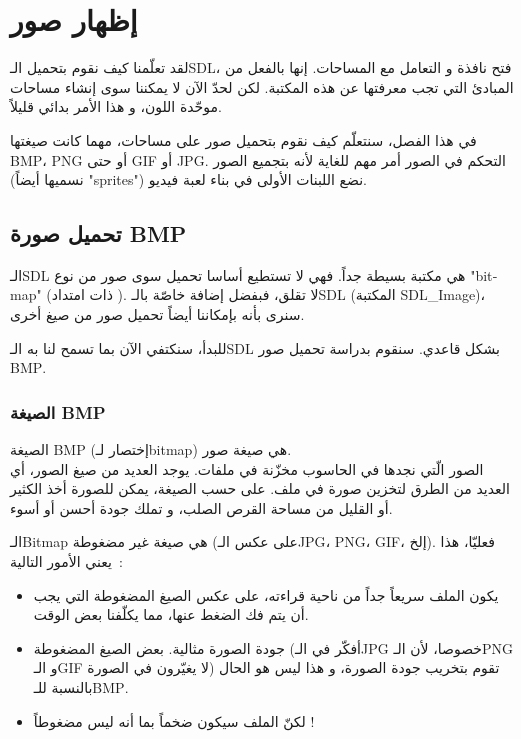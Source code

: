 \chapter{إظهار صور}

لقد تعلّمنا كيف نقوم بتحميل الـ\textenglish{SDL}،
فتح نافذة و التعامل مع المساحات. إنها بالفعل من المبادئ التي تجب معرفتها عن هذه المكتبة. لكن لحدّ الآن لا يمكننا سوى إنشاء مساحات موحّدة اللون، و هذا الأمر بدائي قليلاً.

في هذا الفصل، سنتعلّم كيف نقوم بتحميل صور على مساحات، مهما كانت صيغتها
\textenglish{BMP}،
\textenglish{PNG}
أو حتى 
\textenglish{GIF}
أو 
\textenglish{JPG}.
التحكم في الصور أمر مهم للغاية لأنه بتجميع الصور (نسميها أيضاً 
"\textenglish{sprites}")
نضع اللبنات الأولى في بناء لعبة فيديو.

\section{تحميل صورة \textenglish{BMP}}

الـ\textenglish{SDL}
هي مكتبة بسيطة جداً. فهي لا تستطيع أساسا تحميل سوى صور من نوع
"\textenglish{bitmap}"
(ذات امتداد
).
لا تقلق، فبفضل إضافة خاصّة بالـ\textenglish{SDL}
(المكتبة
\textenglish{SDL\_Image})،
 سنرى بأنه بإمكاننا أيضاً تحميل صور من صيغ أخرى.
 
 للبدأ، سنكتفي الآن بما تسمح لنا به الـ\textenglish{SDL}
 بشكل قاعدي. سنقوم بدراسة تحميل صور
\textenglish{BMP}.

\subsection{الصيغة \textenglish{BMP}}

الصيغة
\textenglish{BMP}
(إختصار لـ\textenglish{bitmap})
هي صيغة صور.\\
الصور الّتي نجدها في الحاسوب مخزّنة في ملفات. يوجد العديد من صيغ الصور، أي العديد من الطرق لتخزين صورة في ملف. على حسب الصيغة، يمكن للصورة أخذ الكثير أو القليل من مساحة القرص الصلب، و تملك جودة أحسن أو أسوء.

الـ\textenglish{Bitmap}
هي صيغة غير مضغوطة (على عكس الـ\textenglish{JPG}، \textenglish{PNG}، \textenglish{GIF}،
إلخ).
فعليّا، هذا يعني الأمور التالية~:

\begin{itemize}
	\item يكون الملف سريعاً جداً من ناحية قراءته، على عكس الصيغ المضغوطة التي يجب أن يتم فك الضغط عنها، مما يكلّفنا بعض الوقت.
	\item جودة الصورة مثالية. بعض الصيغ المضغوطة (أفكّر في الـ\textenglish{JPG}
	خصوصا، لأن الـ\textenglish{PNG}
	و الـ\textenglish{GIF}
	لا يغيّرون في الصورة) تقوم بتخريب جودة الصورة، و هذا ليس هو الحال بالنسبة للـ\textenglish{BMP}.
	\item لكنّ الملف سيكون ضخماً بما أنه ليس مضغوطاً !
\end{itemize}

